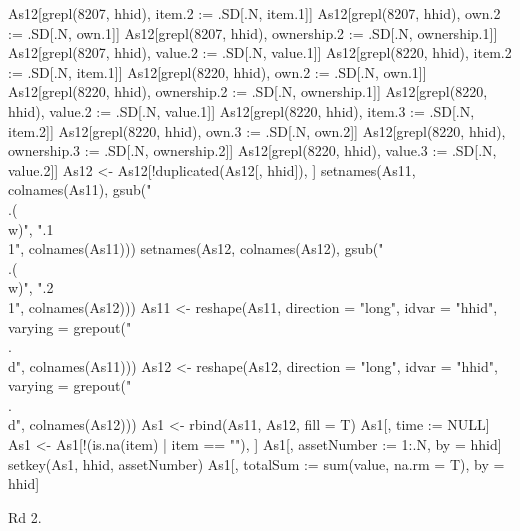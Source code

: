 \begin{Schunk}
\begin{Soutput}
               
               
               
               
\end{Soutput}
\begin{Sinput}
As12[grepl(8207, hhid), item.2 := .SD[.N, item.1]]
As12[grepl(8207, hhid), own.2 := .SD[.N, own.1]]
As12[grepl(8207, hhid), ownership.2 := .SD[.N, ownership.1]]
As12[grepl(8207, hhid), value.2 := .SD[.N, value.1]]
As12[grepl(8220, hhid), item.2 := .SD[.N, item.1]]
As12[grepl(8220, hhid), own.2 := .SD[.N, own.1]]
As12[grepl(8220, hhid), ownership.2 := .SD[.N, ownership.1]]
As12[grepl(8220, hhid), value.2 := .SD[.N, value.1]]
As12[grepl(8220, hhid), item.3 := .SD[.N, item.2]]
As12[grepl(8220, hhid), own.3 := .SD[.N, own.2]]
As12[grepl(8220, hhid), ownership.3 := .SD[.N, ownership.2]]
As12[grepl(8220, hhid), value.3 := .SD[.N, value.2]]
As12 <- As12[!duplicated(As12[, hhid]), ]
setnames(As11, colnames(As11), gsub("\\.(\\w)", ".1\\1", colnames(As11)))
setnames(As12, colnames(As12), gsub("\\.(\\w)", ".2\\1", colnames(As12)))
As11 <- reshape(As11, direction = "long", idvar = "hhid",
	varying = grepout("\\.\\d", colnames(As11)))
As12 <- reshape(As12, direction = "long", idvar = "hhid",
	varying = grepout("\\.\\d", colnames(As12)))
As1 <- rbind(As11, As12, fill = T)
As1[, time := NULL]
As1 <- As1[!(is.na(item) | item == ""), ]
As1[, assetNumber := 1:.N, by = hhid]
setkey(As1, hhid, assetNumber)
As1[, totalSum := sum(value, na.rm = T), by = hhid]
\end{Sinput}
\end{Schunk}
Rd 2.
